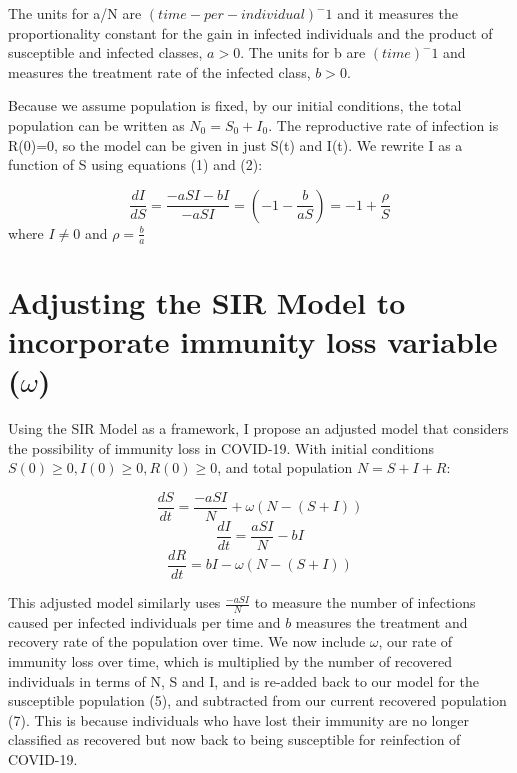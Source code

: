 \documentclass[%
 reprint,
]{revtex4-2}
\begin{document}
The units for a/N are $(time-per-individual)^-1$ and it measures the proportionality constant for the gain in infected individuals and the product of susceptible and infected classes, $a>0$. The units for b are $(time)^-1$ and measures the treatment rate of the infected class, $b>0$. 

Because we assume population is fixed, by our initial conditions, the total population can be written as $N_0=S_0+I_0$. The reproductive rate of infection is R(0)=0, so the model can be given in just S(t) and I(t). We rewrite I as a function of S using equations (1) and (2):

\begin{equation} \frac{dI}{dS} = \frac{-aSI-bI}{-aSI} = (-1-\frac{b}{aS}) = -1+\frac{\rho}{S} \end{equation} where $I \neq 0$ and $\rho=\frac{b}{a}$

\section{\label{sec:level1}Adjusting the SIR Model to incorporate immunity loss variable ($\omega$)\protect\\}

Using the SIR Model as a framework, I propose an adjusted model that considers the possibility of immunity loss in COVID-19. With initial conditions $S(0)\geq0, I(0)\geq0, R(0)\geq0$, and total population $N=S+I+R$:

\begin{equation} \frac{dS}{dt} = \frac{-aSI}{N} + \omega(N-(S+I)) \end{equation}
\begin{equation} \frac{dI}{dt} = \frac{aSI}{N} - bI \end{equation}
\begin{equation} \frac{dR}{dt} = bI - \omega(N-(S+I)) \end{equation}

This adjusted model similarly uses $\frac{-aSI}{N}$ to measure the number of infections caused per infected individuals per time and $b$ measures the treatment and recovery rate of the population over time. We now include $\omega$, our rate of immunity loss over time, which is multiplied by the number of recovered individuals in terms of N, S and I, and is re-added back to our model for the susceptible population (5), and subtracted from our current recovered population (7). This is because individuals who have lost their immunity are no longer classified as recovered but now back to being susceptible for reinfection of COVID-19. 
\end{document}
